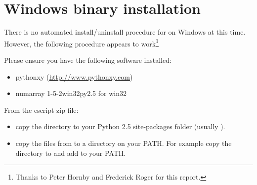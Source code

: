 
%
%
%

\section{Windows binary installation}
\label{sec:binwin}

There is no automated install/uninstall procedure for \escript on Windows at this time.
However, the following procedure appears to work\footnote{Thanks to Peter Hornby and Frederick Roger for this report.}

Please ensure you have the following software installed: 
\begin{itemize}
 \item pythonxy (\url{http://www.pythonxy.com})
\item numarray 1-5-2win32py2.5  for  win32
\end{itemize}

From the escript zip file:
\begin{itemize}
\item 
 copy the  directory to your Python 2.5 site-packages folder (usually ).
\item 
 copy the  files from  to a directory on your PATH. For example copy the directory to  and add   to your PATH.
\end{itemize}

